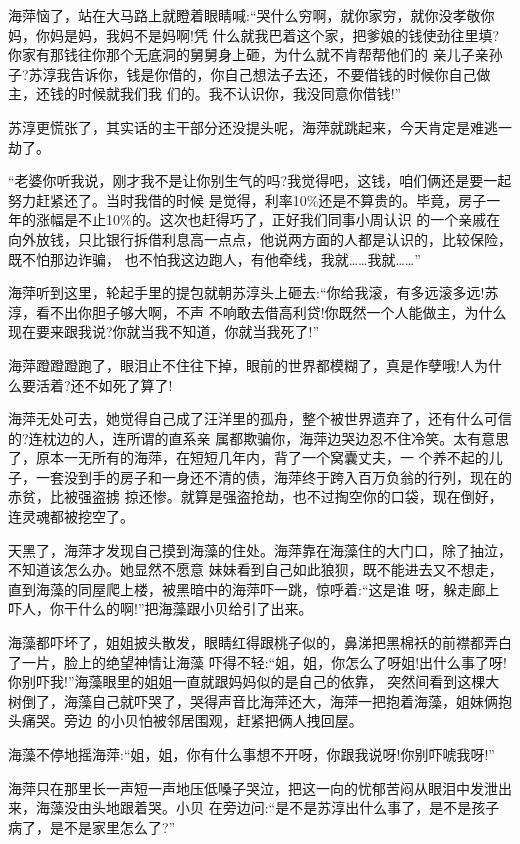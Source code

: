 \documentclass[11pt,a4paper,onecolumn]{article}
\begin{document}
海萍恼了，站在大马路上就瞪着眼睛喊:``哭什么穷啊，就你家穷，就你没孝敬你妈，你妈是妈，我妈不是妈啊!凭
什么就我巴着这个家，把爹娘的钱使劲往里填?你家有那钱往你那个无底洞的舅舅身上砸，为什么就不肯帮帮他们的
亲儿子亲孙子?苏淳我告诉你，钱是你借的，你自己想法子去还，不要借钱的时候你自己做主，还钱的时候就我们我
们的。我不认识你，我没同意你借钱!''

苏淳更慌张了，其实话的主干部分还没提头呢，海萍就跳起来，今天肯定是难逃一劫了。

``老婆你听我说，刚才我不是让你别生气的吗?我觉得吧，这钱，咱们俩还是要一起努力赶紧还了。当时我借的时候
是觉得，利率10\%还是不算贵的。毕竟，房子一年的涨幅是不止10\%的。这次也赶得巧了，正好我们同事小周认识
的一个亲戚在向外放钱，只比银行拆借利息高一点点，他说两方面的人都是认识的，比较保险，既不怕那边诈骗，
也不怕我这边跑人，有他牵线，我就……我就……''

海萍听到这里，轮起手里的提包就朝苏淳头上砸去:``你给我滚，有多远滚多远!苏淳，看不出你胆子够大啊，不声
不响敢去借高利贷!你既然一个人能做主，为什么现在要来跟我说?你就当我不知道，你就当我死了!''

海萍蹬蹬蹬跑了，眼泪止不住往下掉，眼前的世界都模糊了，真是作孽哦!人为什么要活着?还不如死了算了!

海萍无处可去，她觉得自己成了汪洋里的孤舟，整个被世界遗弃了，还有什么可信的?连枕边的人，连所谓的直系亲
属都欺骗你，海萍边哭边忍不住冷笑。太有意思了，原本一无所有的海萍，在短短几年内，背了一个窝囊丈夫，一
个养不起的儿子，一套没到手的房子和一身还不清的债，海萍终于跨入百万负翁的行列，现在的赤贫，比被强盗掳
掠还惨。就算是强盗抢劫，也不过掏空你的口袋，现在倒好，连灵魂都被挖空了。

天黑了，海萍才发现自己摸到海藻的住处。海萍靠在海藻住的大门口，除了抽泣，不知道该怎么办。她显然不愿意
妹妹看到自己如此狼狈，既不能进去又不想走，直到海藻的同屋爬上楼，被黑暗中的海萍吓一跳，惊呼着:``这是谁
呀，躲走廊上吓人，你干什么的啊!''把海藻跟小贝给引了出来。

海藻都吓坏了，姐姐披头散发，眼睛红得跟桃子似的，鼻涕把黑棉袄的前襟都弄白了一片，脸上的绝望神情让海藻
吓得不轻:``姐，姐，你怎么了呀姐!出什么事了呀!你别吓我!''海藻眼里的姐姐一直就跟妈妈似的是自己的依靠，
突然间看到这棵大树倒了，海藻自己就吓哭了，哭得声音比海萍还大，海萍一把抱着海藻，姐妹俩抱头痛哭。旁边
的小贝怕被邻居围观，赶紧把俩人拽回屋。

海藻不停地摇海萍:``姐，姐，你有什么事想不开呀，你跟我说呀!你别吓唬我呀!''

海萍只在那里长一声短一声地压低嗓子哭泣，把这一向的忧郁苦闷从眼泪中发泄出来，海藻没由头地跟着哭。小贝
在旁边问:``是不是苏淳出什么事了，是不是孩子病了，是不是家里怎么了?''
\end{document}
